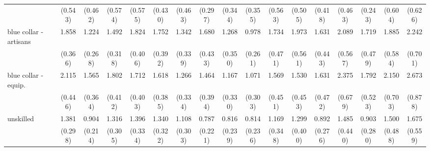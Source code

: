 {\begin{tabular}{l*{16}{c}}
                    &     (0.543)         &     (0.462)         &     (0.574)         &     (0.575)         &     (0.430)         &     (0.463)         &     (0.297)         &     (0.344)         &     (0.355)         &     (0.563)         &     (0.505)         &     (0.418)         &     (0.463)         &     (0.243)         &     (0.604)         &     (0.626)         \\
[1em]
blue collar - artisans&       1.858\sym{**} &       1.224         &       1.492         &       1.824\sym{**} &       1.752\sym{*}  &       1.342         &       1.680\sym{*}  &       1.268         &       0.978         &       1.734\sym{*}  &       1.973\sym{*}  &       1.631         &       2.089\sym{**} &       1.719         &       1.885\sym{*}  &       2.242\sym{**} \\
                    &     (0.366)         &     (0.268)         &     (0.318)         &     (0.406)         &     (0.392)         &     (0.339)         &     (0.433)         &     (0.350)         &     (0.261)         &     (0.471)         &     (0.561)         &     (0.443)         &     (0.567)         &     (0.479)         &     (0.584)         &     (0.701)         \\
[1em]
blue collar - equip.&       2.115\sym{***}&       1.565         &       1.802\sym{**} &       1.712\sym{*}  &       1.618\sym{*}  &       1.266         &       1.464         &       1.167         &       1.071         &       1.569         &       1.530         &       1.631         &       2.375\sym{**} &       1.792\sym{*}  &       2.150\sym{*}  &       2.673\sym{**} \\
                    &     (0.446)         &     (0.364)         &     (0.412)         &     (0.403)         &     (0.385)         &     (0.334)         &     (0.394)         &     (0.330)         &     (0.303)         &     (0.451)         &     (0.453)         &     (0.472)         &     (0.679)         &     (0.523)         &     (0.703)         &     (0.878)         \\
[1em]
unskilled           &       1.381         &       0.904         &       1.316         &       1.396         &       1.340         &       1.108         &       0.787         &       0.816         &       0.814         &       1.169         &       1.299         &       0.892         &       1.485         &       0.903         &       1.500         &       1.675         \\
                    &     (0.298)         &     (0.214)         &     (0.305)         &     (0.334)         &     (0.322)         &     (0.303)         &     (0.221)         &     (0.239)         &     (0.236)         &     (0.348)         &     (0.400)         &     (0.276)         &     (0.440)         &     (0.280)         &     (0.488)         &     (0.559)         \\

\end{tabular}}
